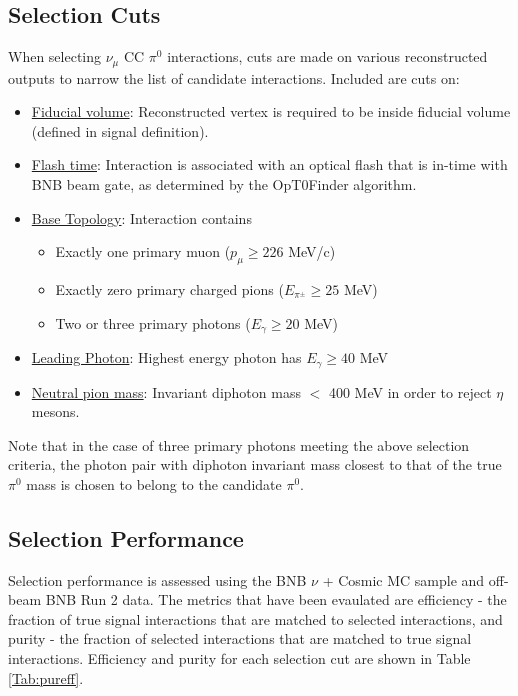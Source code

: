 \documentclass[../main.tex]{subfiles}
\begin{document}
\subsection{Selection Cuts}
When selecting $\nu_{\mu}$ CC $\pi^{0}$ interactions, cuts are made on various reconstructed outputs to narrow the list of candidate interactions.  Included are cuts on:
\begin{itemize}
    \item \underline{Fiducial volume}: Reconstructed vertex is required to be inside fiducial volume (defined in signal definition).
    \item \underline{Flash time}: Interaction is associated with an optical flash that is in-time with BNB beam gate, as determined by the OpT0Finder algorithm.
    \item \underline{Base Topology}: Interaction contains
        \begin{itemize}
            \item Exactly one primary muon ($p_{\mu} \ge 226$ MeV/c)
            \item Exactly zero primary charged pions ($E_{\pi^{\pm}} \ge 25$ MeV)
            \item Two or three primary photons ($E_{\gamma} \ge 20$ MeV)
        \end{itemize}
    \item \underline{Leading Photon}: Highest energy photon has $E_{\gamma} \ge 40$ MeV
    \item \underline{Neutral pion mass}: Invariant diphoton mass $<$ 400 MeV in order to reject $\eta$ mesons.
\end{itemize}
Note that in the case of three primary photons meeting the above selection criteria, the photon pair with diphoton invariant mass closest to that of the true $\pi^{0}$ mass is chosen to belong to the candidate $\pi^{0}$.

\subsection{Selection Performance}
Selection performance is assessed using the BNB $\nu$ + Cosmic MC sample and off-beam BNB Run 2 data.  The metrics that have been evaulated are efficiency - the fraction of true signal interactions that are matched to selected interactions, and purity - the fraction of selected interactions that are matched to true signal interactions.  Efficiency and purity for each selection cut are shown in Table \ref{Tab:pureff}.
\end{document}
